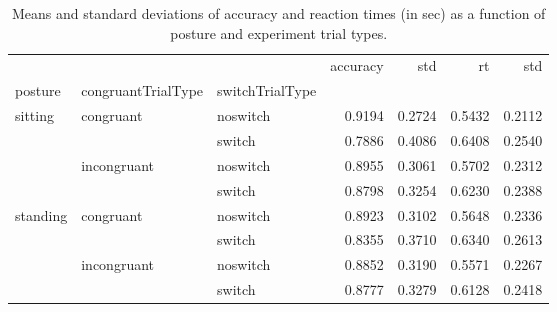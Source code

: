 \begin{table}
\centering
\caption{Means and standard deviations of accuracy and reaction times (in sec) as a function of posture and experiment trial types.}
\label{table-task-switching-replication-reaction-time}
\begin{tabular}{lllrrrr}
\toprule
         &             &        & accuracy &    std &     rt &    std \\
posture & congruantTrialType & switchTrialType &          &        &        &        \\
\midrule
sitting & congruant & noswitch &   0.9194 & 0.2724 & 0.5432 & 0.2112 \\
         &             & switch &   0.7886 & 0.4086 & 0.6408 & 0.2540 \\
         & incongruant & noswitch &   0.8955 & 0.3061 & 0.5702 & 0.2312 \\
         &             & switch &   0.8798 & 0.3254 & 0.6230 & 0.2388 \\
standing & congruant & noswitch &   0.8923 & 0.3102 & 0.5648 & 0.2336 \\
         &             & switch &   0.8355 & 0.3710 & 0.6340 & 0.2613 \\
         & incongruant & noswitch &   0.8852 & 0.3190 & 0.5571 & 0.2267 \\
         &             & switch &   0.8777 & 0.3279 & 0.6128 & 0.2418 \\
\bottomrule
\end{tabular}
\end{table}
